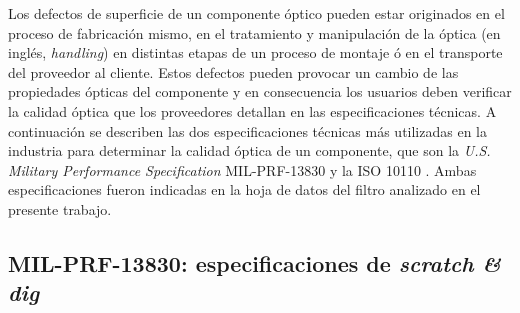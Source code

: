 \begin{figure}[H]
	\begin{floatrow}
	\end{floatrow}
\end{figure}

Los defectos de superficie de un componente óptico pueden estar originados en el proceso de fabricación mismo, en el tratamiento y manipulación de la óptica (en inglés, \textit{handling}) en distintas etapas de un proceso de montaje ó en el transporte del proveedor al cliente. Estos defectos pueden provocar un cambio de las propiedades ópticas del componente y en consecuencia los usuarios deben verificar la calidad óptica que los proveedores detallan en las especificaciones técnicas. A continuación se describen las dos especificaciones técnicas más utilizadas en la industria para determinar la calidad óptica de un componente, que son la \textit{U.S. Military Performance Specification} MIL-PRF-13830 y la ISO 10110 \cite{milprf}\cite{iso10110}. Ambas especificaciones fueron indicadas en la hoja de datos del filtro analizado en el presente trabajo.

\singlespacing
\subsection{MIL-PRF-13830: especificaciones de \textit{scratch \& dig}}
\label{sec:scanddig}

